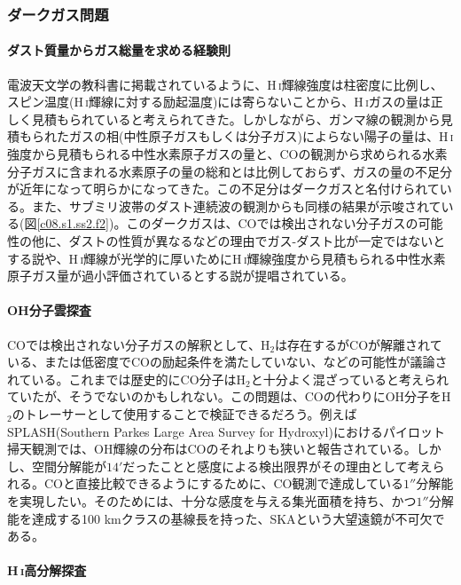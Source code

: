 \subsubsection{ダークガス問題}
\label{c08.s1.ss2.sss3}

\paragraph{ダスト質量からガス総量を求める経験則}

電波天文学の教科書に掲載されているように、H\,\textsc{i}輝線強度は柱密度に比例し、スピン温度(H\,\textsc{i}輝線に対する励起温度)には寄らないことから、H\,\textsc{i}ガスの量は正しく見積もられていると考えられてきた。しかしながら、ガンマ線の観測から見積もられたガスの相(中性原子ガスもしくは分子ガス)によらない陽子の量は、H\,\textsc{i}強度から見積もられる中性水素原子ガスの量と、COの観測から求められる水素分子ガスに含まれる水素原子の量の総和とは比例しておらず、ガスの量の不足分が近年になって明らかになってきた。この不足分はダークガスと名付けられている\citep{2005Sci...307.1292G}。また、サブミリ波帯のダスト連続波の観測\citep{2011A&A...536A..19P}からも同様の結果が示唆されている(図\ref{c08.s1.ss2.f2})。このダークガスは、COでは検出されない分子ガスの可能性の他に、ダストの性質が異なるなどの理由でガス-ダスト比が一定ではないとする説や、H\,\textsc{i}輝線が光学的に厚いためにH\,\textsc{i}輝線強度から見積もられる中性水素原子ガス量が過小評価されているとする説が提唱されている。

\paragraph{OH分子雲探査}

COでは検出されない分子ガスの解釈として、H$_2$は存在するがCOが解離されている、または低密度でCOの励起条件を満たしていない、などの可能性が議論されている。これまでは歴史的にCO分子はH$_2$と十分よく混ざっていると考えられていたが、そうでないのかもしれない。この問題は、COの代わりにOH分子をH$_2$のトレーサーとして使用することで検証できるだろう。例えばSPLASH(Southern Parkes Large Area Survey for Hydroxyl)におけるパイロット掃天観測では、OH輝線の分布はCOのそれよりも狭いと報告されている\citep{2014MNRAS.439.1596D}。しかし、空間分解能が$14'$だったことと感度による検出限界がその理由として考えられる。COと直接比較できるようにするために、CO観測で達成している$1''$分解能を実現したい。そのためには、十分な感度を与える集光面積を持ち、かつ$1''$分解能を達成する100 kmクラスの基線長を持った、SKAという大望遠鏡が不可欠である。

\paragraph{H\,\textsc{i}高分解探査}


